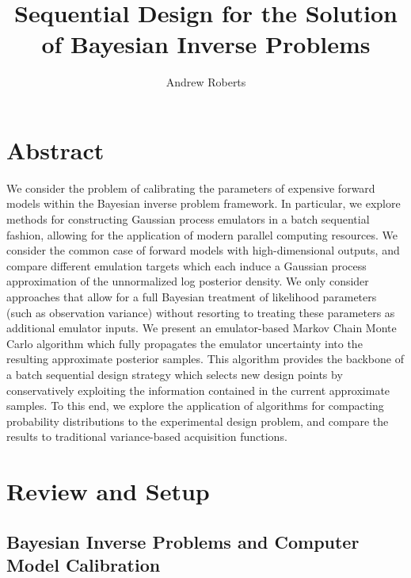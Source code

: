 \documentclass[12pt]{article}
\title{Sequential Design for the Solution of Bayesian Inverse Problems}
\author{Andrew Roberts}
\begin{document}
\maketitle
\tableofcontents
\newpage

\section{Abstract}
We consider the problem of calibrating the parameters of expensive forward models within the Bayesian inverse problem framework. In particular, we 
explore methods for constructing Gaussian process emulators in a batch sequential fashion, allowing for the application of modern parallel computing 
resources. We consider the common case of forward models with high-dimensional outputs, and compare different emulation targets which each induce 
a Gaussian process approximation of the unnormalized log posterior density. We only consider approaches that allow 
for a full Bayesian treatment of likelihood parameters (such as observation variance) without resorting to treating these parameters as additional emulator
inputs. We present an emulator-based Markov Chain Monte Carlo algorithm which 
fully propagates the emulator uncertainty into the resulting approximate posterior samples. This algorithm provides the backbone of a batch sequential 
design strategy which selects new design points by conservatively exploiting the information contained in the current approximate samples. To this end, we 
explore the application of algorithms for compacting probability distributions to the experimental design problem, and compare the results to traditional 
variance-based acquisition functions. 

\section{Review and Setup}

\subsection{Bayesian Inverse Problems and Computer Model Calibration}
\end{document}

